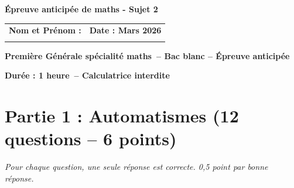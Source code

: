 \documentclass[a4paper,12pt]{article}
\newcommand{\sujet}{2}
\newcommand{\classe}{Première Générale spécialité maths}
\newcommand{\duree}{1 heure}
\newcommand{\datedevoir}{Mars 2026}
\newcommand{\theme}{Bac blanc -- Épreuve anticipée}
\begin{document}
\begin{center}\Large\textbf{Épreuve anticipée de maths - Sujet \sujet}\end{center}

\begin{tabular}{|p{7.5cm}|p{7.5cm}|}
\hline
\textbf{Nom et Prénom :} & \textbf{Date : \datedevoir} \\
\framebox[7cm]{\hspace{0.1cm}\begin{minipage}{6.8cm}\vspace{1.5cm}\end{minipage}} & \\
\hline
\end{tabular}

\begin{center}\textbf{\classe\ -- \theme}\end{center}

\textbf{Durée : \duree\ -- Calculatrice interdite}

\section*{Partie 1 : Automatismes (12 questions -- 6 points)}
\textit{Pour chaque question, une seule réponse est correcte. 0,5 point par bonne réponse.}
\end{document}
